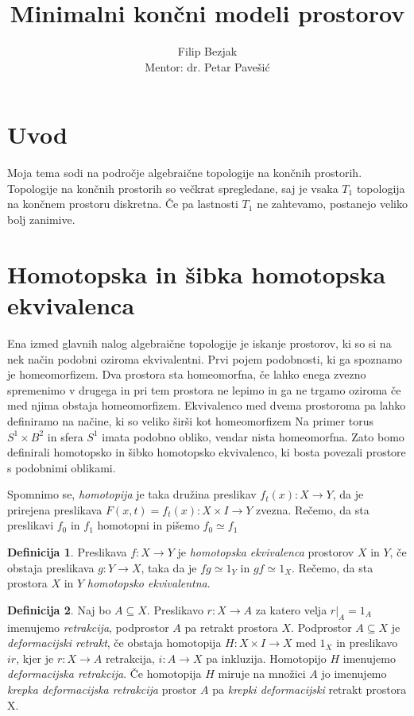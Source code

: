 \documentclass[a4paper,12pt]{article}
\title{Minimalni končni modeli prostorov}
\author{Filip Bezjak \\ Mentor: dr. Petar Pavešić}
\theoremstyle{definition}
\newtheorem{definicija}{Definicija}
\theoremstyle{plain}
\theoremstyle{definition}
\theoremstyle{plain}
\theoremstyle{plain}
\theoremstyle{plain}
\theoremstyle{plain}
\begin{document}
\maketitle

\section{Uvod}
Moja tema sodi na področje algebraične topologije na končnih prostorih. Topologije na končnih prostorih so večkrat spregledane, saj je vsaka $T_1$ topologija
na končnem prostoru diskretna. Če pa lastnosti $T_1$ ne zahtevamo, postanejo veliko bolj
zanimive.

\section{Homotopska in šibka homotopska ekvivalenca}

Ena izmed glavnih nalog algebraične topologije je iskanje prostorov, ki so si 
na nek način podobni oziroma ekvivalentni. Prvi pojem podobnosti, ki ga spoznamo
je homeomorfizem. Dva prostora sta homeomorfna, če lahko enega zvezno spremenimo v drugega in pri tem prostora ne lepimo in ga ne trgamo oziroma če med njima obstaja homeomorfizem. Ekvivalenco med dvema 
prostoroma pa lahko definiramo na načine, ki so veliko širši kot homeomorfizem
Na primer torus $S^1\times B^2$ in sfera $S^1$ imata podobno obliko, vendar nista
 homeomorfna. Zato bomo definirali homotopsko in šibko homotopsko ekvivalenco, ki bosta povezali prostore s podobnimi oblikami.

Spomnimo se, \textit{homotopija} je taka družina preslikav $f_t(x):X \rightarrow Y$, da je prirejena preslikava $F(x,t)=f_t(x):X \times I \rightarrow Y$ zvezna. Rečemo, da sta preslikavi $f_0$ in $f_1$ homotopni in pišemo $f_0 \simeq f_1$


\begin{definicija}
    Preslikava  $f : X \rightarrow Y$ je \textit{homotopska ekvivalenca} prostorov $X$ in $Y$, če obstaja preslikava $g: Y\rightarrow X$, taka da
    je $f g \simeq 1_Y$ in $gf \simeq 1_X$. Rečemo, da sta prostora $X$ in
    $Y$  \textit{homotopsko ekvivalentna}.
\end{definicija}

\begin{definicija}
    Naj bo $A \subseteq X$. Preslikavo $r : X \rightarrow A$ za katero 
    velja $r|_A = 1_A$ imenujemo \textit{retrakcija}, podprostor
     $A$ pa retrakt prostora $X$. Podprostor $A \subseteq X$ je 
     \textit{deformacijski retrakt}, če obstaja homotopija $H : X \times
      I \rightarrow X$ med $1_X$ in preslikavo $ir$, kjer je $r : X 
      \rightarrow A$ retrakcija, $i:A\rightarrow X$ pa inkluzija. Homotopijo $H$ imenujemo \textit{deformacijska 
      retrakcija}. Če homotopija $H$ miruje na množici $A$ jo imenujemo 
      \textit{krepka deformacijska retrakcija} prostor $A$ pa 
      \textit{krepki deformacijski} retrakt prostora X.
\end{definicija}
\end{document}
